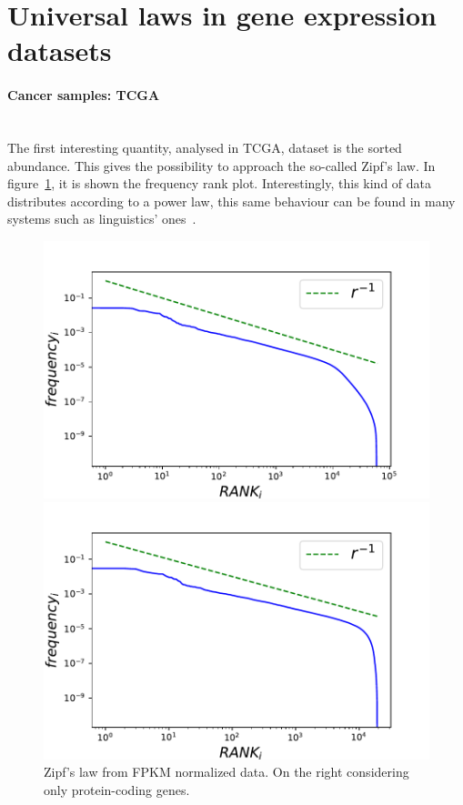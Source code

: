 \section{Universal laws in gene expression datasets}\label{sec:universallaws}
\paragraph{Cancer samples: TCGA}\mbox{} \\
The first interesting quantity, analysed in TCGA, dataset is the sorted abundance. This gives the possibility to approach the so-called Zipf's law.
In figure~\ref{fig:structure/tcga/globalZipf}, it is shown the frequency rank plot. Interestingly, this kind of data distributes according to a power law, this same behaviour can be found in many systems such as linguistics' ones~\cite{altmann2016statistical}.
\begin{figure}[htb!]
	\centering
	\begin{minipage}{0.45\textwidth}
		\includegraphics[width=0.95\linewidth]{pictures/structure/tcga/globalzipf_fpkmall.pdf}
	\end{minipage}
	\hspace{3mm}
	\begin{minipage}{0.45\textwidth}
		\includegraphics[width=0.95\linewidth]{pictures/structure/tcga/globalzipf_fpkm.pdf}
	\end{minipage}
	\caption{Zipf's law from FPKM normalized data. On the right considering only protein-coding genes.}
	\label{fig:structure/tcga/globalZipf}
\end{figure}
